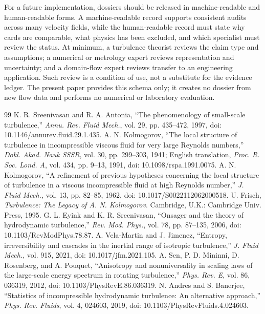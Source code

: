 \documentclass[conference]{../../../../Conference-LaTeX-template_10-17-19/IEEEtran}
\begin{document}
For a future implementation, dossiers should be released in machine-readable and human-readable forms. A machine-readable record supports consistent audits across many velocity fields, while the human-readable record must state why cards are comparable, what physics has been excluded, and which specialist must review the status. At minimum, a turbulence theorist reviews the claim type and assumptions; a numerical or metrology expert reviews representation and uncertainty; and a domain-flow expert reviews transfer to an engineering application. Such review is a condition of use, not a substitute for the evidence ledger. The present paper provides this schema only; it creates no dossier from new flow data and performs no numerical or laboratory evaluation.

\begin{thebibliography}{99}
 K. R. Sreenivasan and R. A. Antonia, ``The phenomenology of small-scale turbulence,'' \emph{Annu. Rev. Fluid Mech.}, vol. 29, pp. 435--472, 1997, doi: 10.1146/annurev.fluid.29.1.435.
 A. N. Kolmogorov, ``The local structure of turbulence in incompressible viscous fluid for very large Reynolds numbers,'' \emph{Dokl. Akad. Nauk SSSR}, vol. 30, pp. 299--303, 1941; English translation, \emph{Proc. R. Soc. Lond. A}, vol. 434, pp. 9--13, 1991, doi: 10.1098/rspa.1991.0075.
 A. N. Kolmogorov, ``A refinement of previous hypotheses concerning the local structure of turbulence in a viscous incompressible fluid at high Reynolds number,'' \emph{J. Fluid Mech.}, vol. 13, pp. 82--85, 1962, doi: 10.1017/S0022112062000518.
 U. Frisch, \emph{Turbulence: The Legacy of A. N. Kolmogorov}. Cambridge, U.K.: Cambridge Univ. Press, 1995.
 G. L. Eyink and K. R. Sreenivasan, ``Onsager and the theory of hydrodynamic turbulence,'' \emph{Rev. Mod. Phys.}, vol. 78, pp. 87--135, 2006, doi: 10.1103/RevModPhys.78.87.
 A. Vela-Martin and J. Jimenez, ``Entropy, irreversibility and cascades in the inertial range of isotropic turbulence,'' \emph{J. Fluid Mech.}, vol. 915, 2021, doi: 10.1017/jfm.2021.105.
 A. Sen, P. D. Mininni, D. Rosenberg, and A. Pouquet, ``Anisotropy and nonuniversality in scaling laws of the large-scale energy spectrum in rotating turbulence,'' \emph{Phys. Rev. E}, vol. 86, 036319, 2012, doi: 10.1103/PhysRevE.86.036319.
 N. Andres and S. Banerjee, ``Statistics of incompressible hydrodynamic turbulence: An alternative approach,'' \emph{Phys. Rev. Fluids}, vol. 4, 024603, 2019, doi: 10.1103/PhysRevFluids.4.024603.
\end{thebibliography}
\end{document}
